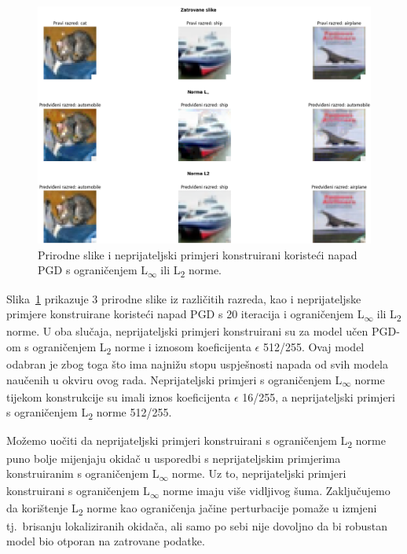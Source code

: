 \documentclass[times, utf8, zavrsni, numeric]{fer}
\begin{document}
\pagebreak

\begin{figure}[htb]
    \centering
    \includegraphics[scale=0.42]{../adv_imgs_multiple_models/linf_l2.png}
    \caption{Prirodne slike i neprijateljski primjeri konstruirani koristeći napad PGD s ograničenjem L\textsubscript{$\infty$} ili L\textsubscript{2} norme.}
    \label{fig:l2_linf_comparison}
\end{figure}

Slika~\ref{fig:l2_linf_comparison} prikazuje 3 prirodne slike iz različitih razreda, kao i neprijateljske primjere konstruirane koristeći napad PGD s 20 iteracija i ograničenjem L\textsubscript{$\infty$} ili L\textsubscript{2} norme.
U oba slučaja, neprijateljski primjeri konstruirani su za model učen PGD-om s ograničenjem L\textsubscript{2} norme i iznosom koeficijenta $\epsilon$ 512/255. 
Ovaj model odabran je zbog toga što ima najnižu stopu uspješnosti napada od svih modela naučenih u okviru ovog rada.
Neprijateljski primjeri s ograničenjem L\textsubscript{$\infty$} norme tijekom konstrukcije su imali iznos koeficijenta $\epsilon$ 16/255, 
a neprijateljski primjeri s ograničenjem L\textsubscript{2} norme 512/255.

Možemo uočiti da neprijateljski primjeri konstruirani s ograničenjem L\textsubscript{2} norme puno bolje mijenjaju okidač u usporedbi s neprijateljskim primjerima konstruiranim s ograničenjem L\textsubscript{$\infty$} norme.
Uz to, neprijateljski primjeri konstruirani s ograničenjem L\textsubscript{$\infty$} norme imaju više vidljivog šuma.
Zaključujemo da korištenje L\textsubscript{2} norme kao ograničenja jačine perturbacije pomaže u izmjeni tj.\ brisanju lokaliziranih okidača, ali samo po sebi nije dovoljno da bi robustan model bio otporan na zatrovane podatke.
\end{document}
